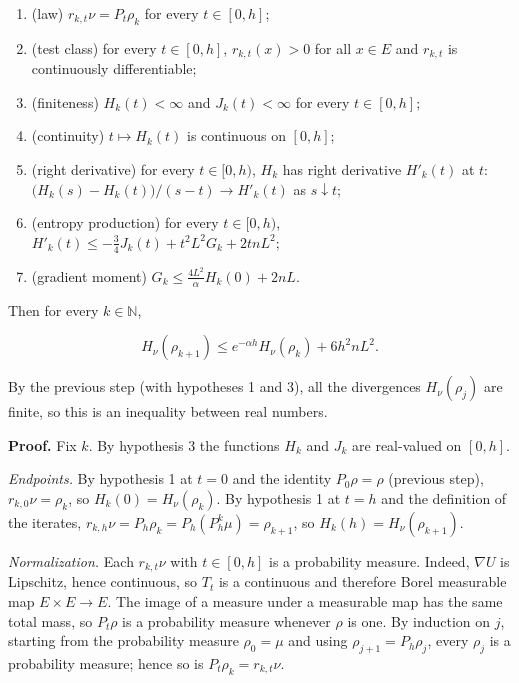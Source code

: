 \documentclass[11pt,a4paper]{report}
\begin{document}
\begin{enumerate}


\item (law) \(r_{k,t}\nu=P_t\rho_k\) for every \(t\in[0,h]\);

\item (test class) for every \(t\in[0,h]\), \(r_{k,t}(x)>0\) for all \(x\in E\) and \(r_{k,t}\) is continuously differentiable;

\item (finiteness) \(H_k(t)<\infty\) and \(J_k(t)<\infty\) for every \(t\in[0,h]\);

\item (continuity) \(t\mapsto H_k(t)\) is continuous on \([0,h]\);

\item (right derivative) for every \(t\in[0,h)\), \(H_k\) has right derivative \(H'_k(t)\) at \(t\): \(\bigl(H_k(s)-H_k(t)\bigr)/(s-t)\to H'_k(t)\) as \(s\downarrow t\);

\item (entropy production) for every \(t\in[0,h)\), \(H'_k(t)\le-\frac34J_k(t)+t^2L^2G_k+2tnL^2\);

\item (gradient moment) \(G_k\le\frac{4L^2}{\alpha}H_k(0)+2nL\).

\end{enumerate}



Then for every \(k\in\mathbb N\),


\[H_\nu(\rho_{k+1})\le e^{-\alpha h}H_\nu(\rho_k)+6h^2nL^2.\]


By the previous step (with hypotheses 1 and 3), all the divergences \(H_\nu(\rho_j)\) are finite, so this is an inequality between real numbers.




\textbf{Proof.} Fix \(k\). By hypothesis 3 the functions \(H_k\) and \(J_k\) are real-valued on \([0,h]\).




\emph{Endpoints.} By hypothesis 1 at \(t=0\) and the identity \(P_0\rho=\rho\) (previous step), \(r_{k,0}\nu=\rho_k\), so \(H_k(0)=H_\nu(\rho_k)\). By hypothesis 1 at \(t=h\) and the definition of the iterates, \(r_{k,h}\nu=P_h\rho_k=P_h(P_h^k\mu)=\rho_{k+1}\), so \(H_k(h)=H_\nu(\rho_{k+1})\).




\emph{Normalization.} Each \(r_{k,t}\nu\) with \(t\in[0,h]\) is a probability measure. Indeed, \(\nabla U\) is Lipschitz, hence continuous, so \(T_t\) is a continuous and therefore Borel measurable map \(E\times E\to E\). The image of a measure under a measurable map has the same total mass, so \(P_t\rho\) is a probability measure whenever \(\rho\) is one. By induction on \(j\), starting from the probability measure \(\rho_0=\mu\) and using \(\rho_{j+1}=P_h\rho_j\), every \(\rho_j\) is a probability measure; hence so is \(P_t\rho_k=r_{k,t}\nu\).
\end{document}
